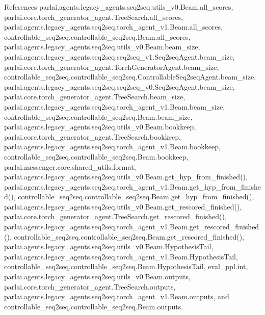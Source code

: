 References parlai.\+agents.\+legacy\+\_\+agents.\+seq2seq.\+utils\+\_\+v0.\+Beam.\+all\+\_\+scores, parlai.\+core.\+torch\+\_\+generator\+\_\+agent.\+Tree\+Search.\+all\+\_\+scores, parlai.\+agents.\+legacy\+\_\+agents.\+seq2seq.\+torch\+\_\+agent\+\_\+v1.\+Beam.\+all\+\_\+scores, controllable\+\_\+seq2seq.\+controllable\+\_\+seq2seq.\+Beam.\+all\+\_\+scores, parlai.\+agents.\+legacy\+\_\+agents.\+seq2seq.\+utils\+\_\+v0.\+Beam.\+beam\+\_\+size, parlai.\+agents.\+legacy\+\_\+agents.\+seq2seq.\+seq2seq\+\_\+v1.\+Seq2seq\+Agent.\+beam\+\_\+size, parlai.\+core.\+torch\+\_\+generator\+\_\+agent.\+Torch\+Generator\+Agent.\+beam\+\_\+size, controllable\+\_\+seq2seq.\+controllable\+\_\+seq2seq.\+Controllable\+Seq2seq\+Agent.\+beam\+\_\+size, parlai.\+agents.\+legacy\+\_\+agents.\+seq2seq.\+seq2seq\+\_\+v0.\+Seq2seq\+Agent.\+beam\+\_\+size, parlai.\+core.\+torch\+\_\+generator\+\_\+agent.\+Tree\+Search.\+beam\+\_\+size, parlai.\+agents.\+legacy\+\_\+agents.\+seq2seq.\+torch\+\_\+agent\+\_\+v1.\+Beam.\+beam\+\_\+size, controllable\+\_\+seq2seq.\+controllable\+\_\+seq2seq.\+Beam.\+beam\+\_\+size, parlai.\+agents.\+legacy\+\_\+agents.\+seq2seq.\+utils\+\_\+v0.\+Beam.\+bookkeep, parlai.\+core.\+torch\+\_\+generator\+\_\+agent.\+Tree\+Search.\+bookkeep, parlai.\+agents.\+legacy\+\_\+agents.\+seq2seq.\+torch\+\_\+agent\+\_\+v1.\+Beam.\+bookkeep, controllable\+\_\+seq2seq.\+controllable\+\_\+seq2seq.\+Beam.\+bookkeep, parlai.\+messenger.\+core.\+shared\+\_\+utils.\+format, parlai.\+agents.\+legacy\+\_\+agents.\+seq2seq.\+utils\+\_\+v0.\+Beam.\+get\+\_\+hyp\+\_\+from\+\_\+finished(), parlai.\+agents.\+legacy\+\_\+agents.\+seq2seq.\+torch\+\_\+agent\+\_\+v1.\+Beam.\+get\+\_\+hyp\+\_\+from\+\_\+finished(), controllable\+\_\+seq2seq.\+controllable\+\_\+seq2seq.\+Beam.\+get\+\_\+hyp\+\_\+from\+\_\+finished(), parlai.\+agents.\+legacy\+\_\+agents.\+seq2seq.\+utils\+\_\+v0.\+Beam.\+get\+\_\+rescored\+\_\+finished(), parlai.\+core.\+torch\+\_\+generator\+\_\+agent.\+Tree\+Search.\+get\+\_\+rescored\+\_\+finished(), parlai.\+agents.\+legacy\+\_\+agents.\+seq2seq.\+torch\+\_\+agent\+\_\+v1.\+Beam.\+get\+\_\+rescored\+\_\+finished(), controllable\+\_\+seq2seq.\+controllable\+\_\+seq2seq.\+Beam.\+get\+\_\+rescored\+\_\+finished(), parlai.\+agents.\+legacy\+\_\+agents.\+seq2seq.\+utils\+\_\+v0.\+Beam.\+Hypothesis\+Tail, parlai.\+agents.\+legacy\+\_\+agents.\+seq2seq.\+torch\+\_\+agent\+\_\+v1.\+Beam.\+Hypothesis\+Tail, controllable\+\_\+seq2seq.\+controllable\+\_\+seq2seq.\+Beam.\+Hypothesis\+Tail, eval\+\_\+ppl.\+int, parlai.\+agents.\+legacy\+\_\+agents.\+seq2seq.\+utils\+\_\+v0.\+Beam.\+outputs, parlai.\+core.\+torch\+\_\+generator\+\_\+agent.\+Tree\+Search.\+outputs, parlai.\+agents.\+legacy\+\_\+agents.\+seq2seq.\+torch\+\_\+agent\+\_\+v1.\+Beam.\+outputs, and controllable\+\_\+seq2seq.\+controllable\+\_\+seq2seq.\+Beam.\+outputs.

